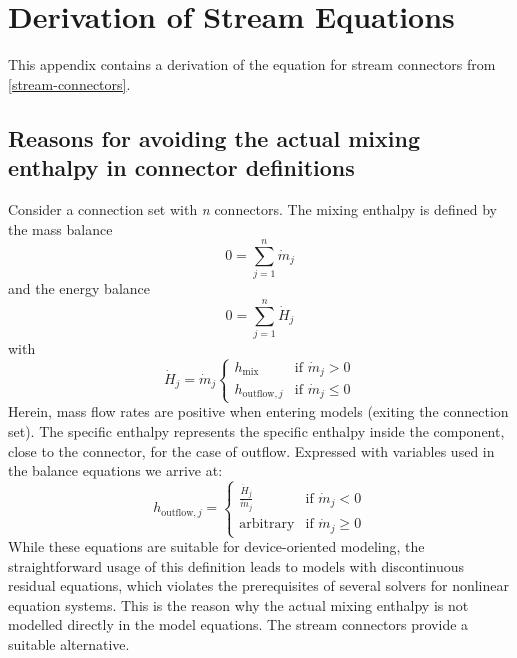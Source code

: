 \chapter{Derivation of Stream Equations}\label{derivation-of-stream-equations}

This appendix contains a derivation of the equation for stream
connectors from \cref{stream-connectors}.

\section{Reasons for avoiding the actual mixing enthalpy in connector definitions}\label{reasons-for-avoiding-the-actual-mixing-enthalpy-in-connector-definitions}

Consider a connection set with \emph{n} connectors. The mixing enthalpy
is defined by the mass balance
\begin{equation*}
0=\sum_{j=1}^n\dot{m}_j
\end{equation*}
and the energy balance
\begin{equation*}
0=\sum_{j=1}^n\dot{H}_j
\end{equation*}
with
\begin{equation*}
\dot{H}_j=\dot{m}_j
\begin{cases}
h_{\mathrm{mix}}&\text{if $\dot{m}_j > 0$}\\
h_{\mathrm{outflow},j}&\text{if $\dot{m}_j \leq 0$}
\end{cases}
\end{equation*}
Herein, mass flow rates are positive when entering models (exiting the
connection set). The specific enthalpy represents the specific enthalpy
inside the component, close to the connector, for the case of outflow.
Expressed with variables used in the balance equations we arrive at:
\begin{equation*}
h_{\mathrm{outflow},j}=
\begin{cases}
\frac{\dot{H}_j}{\dot{m}_j}&\text{if $\dot{m}_j<0$}\\
\textrm{arbitrary}&\text{if $\dot{m}_j \geq 0$}
\end{cases}
\end{equation*}
While these equations are suitable for device-oriented modeling, the
straightforward usage of this definition leads to models with
discontinuous residual equations, which violates the prerequisites of
several solvers for nonlinear equation systems. This is the reason why
the actual mixing enthalpy is not modelled directly in the model
equations. The stream connectors provide a suitable alternative.

